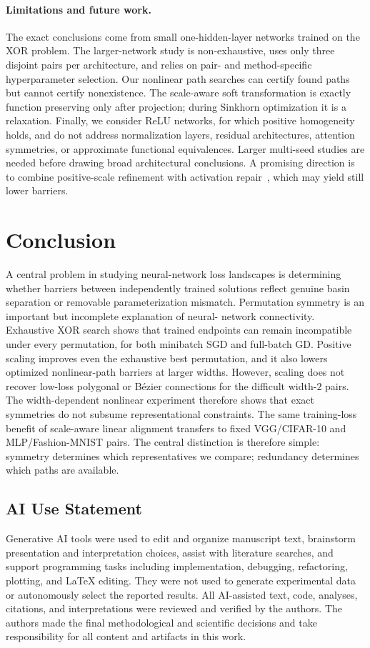 \documentclass[twoside]{article}
\begin{document}
\paragraph{Limitations and future work.}
The exact conclusions come from small one-hidden-layer networks trained on the
XOR problem.  The larger-network study is non-exhaustive, uses only three
disjoint pairs per architecture, and relies on pair- and method-specific
hyperparameter selection.  Our nonlinear path searches can
certify found paths but cannot certify nonexistence.  The scale-aware soft
transformation is exactly function preserving only after projection; during
Sinkhorn optimization it is a relaxation.  Finally, we consider ReLU networks,
for which positive homogeneity holds, and do not address normalization layers,
residual architectures, attention symmetries, or approximate functional
equivalences.  Larger multi-seed studies are needed before drawing broad
architectural conclusions.  A promising direction is to combine positive-scale
refinement with activation repair~\citep{jordan2023repair}, which may yield
still lower barriers.

\clearpage
\section{Conclusion}

A central problem in studying neural-network loss landscapes is determining
whether barriers between independently trained solutions reflect genuine basin
separation or removable parameterization mismatch.
Permutation symmetry is an important but incomplete explanation of neural-
network connectivity.  Exhaustive XOR search shows that trained endpoints can
remain incompatible under every permutation, for both minibatch SGD and
full-batch GD.  Positive scaling improves even the exhaustive best permutation,
and it also lowers optimized nonlinear-path barriers at larger widths.
However, scaling does not recover low-loss polygonal or B\'ezier connections
for the difficult width-$2$ pairs.  The width-dependent nonlinear experiment
therefore shows that exact symmetries do not subsume representational
constraints.  The same training-loss benefit of scale-aware linear alignment transfers to fixed
VGG/CIFAR-10 and MLP/Fashion-MNIST pairs.  The central distinction is therefore
simple: symmetry determines which representatives we compare; redundancy
determines which paths are available.

\subsection*{AI Use Statement}
Generative AI tools were used to edit and organize manuscript text, brainstorm
presentation and interpretation choices, assist with literature searches, and
support programming tasks including implementation, debugging, refactoring,
plotting, and \LaTeX{} editing.  They were not used to generate experimental
data or autonomously select the reported results.  All AI-assisted text, code,
analyses, citations, and interpretations were reviewed and verified by the
authors.  The authors made the final methodological and scientific decisions
and take responsibility for all content and artifacts in this work.
\end{document}
